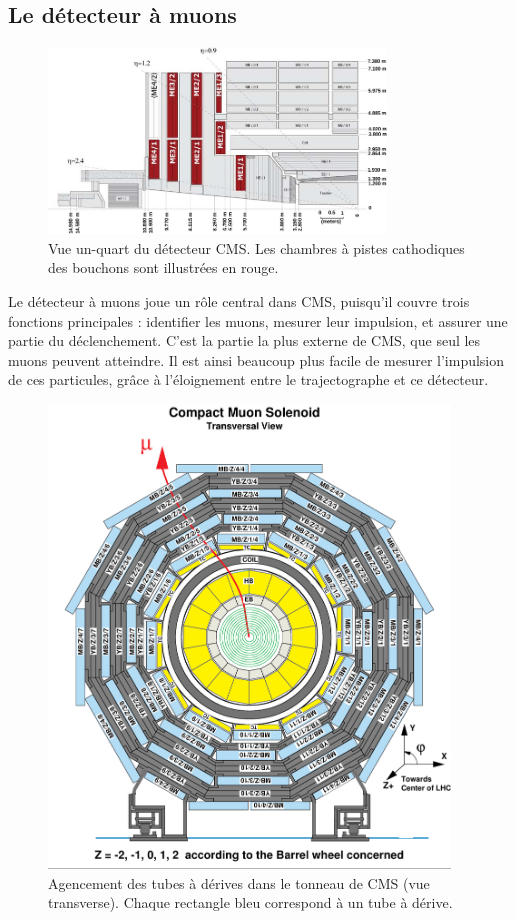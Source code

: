 \subsection{Le détecteur à muons}

\begin{figure}[tb] \centering
  \includegraphics[width=0.8\textwidth]{chapitre2/figs/CSC.pdf}
  \caption{Vue un-quart du détecteur CMS. Les chambres à pistes cathodiques des bouchons sont illustrées en rouge.}
  \label{fig:cms_csc}
\end{figure}


Le détecteur à muons joue un rôle central dans CMS, puisqu'il couvre trois fonctions principales : identifier les muons, mesurer leur impulsion, et assurer une partie du déclenchement. C'est la partie la plus externe de CMS, que seul les muons peuvent atteindre. Il est ainsi beaucoup plus facile de mesurer l'impulsion de ces particules, grâce à l'éloignement entre le trajectographe et ce détecteur.

\begin{figure}[p] \centering
  \includegraphics[width=0.95\textwidth]{chapitre2/figs/CMS_transverse_view.pdf}
  \caption{Agencement des tubes à dérives dans le tonneau de CMS (vue transverse). Chaque rectangle bleu correspond à un tube à dérive.}
  \label{fig:cms_dt}
\end{figure}

